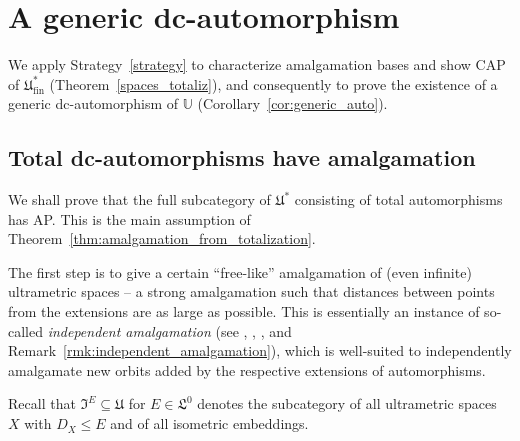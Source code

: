 \documentclass[oneside,notitlepage,12pt]{article}
\theoremstyle{definition}
\theoremstyle{remark}
\newcommand \subs {\subseteq}
\newcommand \U {\mathbb{U}}
\newcommand \fin {{\operatorname{fin}}}
\newcommand \Lin {\mathfrak{L}}
\newcommand \Ult {\mathfrak{U}}
\newcommand \UltIso {\mathfrak{I}}
\begin{document}
\section{A generic dc-automorphism}


We apply Strategy~\ref{strategy} to characterize amalgamation bases and show CAP of $\Ult^*_\fin$ (Theorem~\ref{spaces_totaliz}), and consequently to prove the existence of a generic dc-automorphism of $\U$ (Corollary~\ref{cor:generic_auto}).


\subsection{Total dc-automorphisms have amalgamation}

We shall prove that the full subcategory of $\Ult^*$ consisting of total automorphisms has AP.
This is the main assumption of Theorem~\ref{thm:amalgamation_from_totalization}.

The first step is to give a certain ``free-like'' amalgamation of (even infinite) ultrametric spaces – a strong amalgamation such that distances between points from the extensions are as large as possible.
This is essentially an instance of so-called \emph{independent amalgamation} (see \cite[Section~3]{Solecki05}, \cite[Section~2]{DouchaMalicki19}, \cite[Definition~2.3]{Sabok19}, and Remark~\ref{rmk:independent_amalgamation}), which is well-suited to independently amalgamate new orbits added by the respective extensions of automorphisms.

\medskip

Recall that $\UltIso^E \subs \Ult$ for $E \in \Lin^0$ denotes the subcategory of all ultrametric spaces $X$ with $D_X \leq E$ and of all isometric embeddings.
\end{document}
